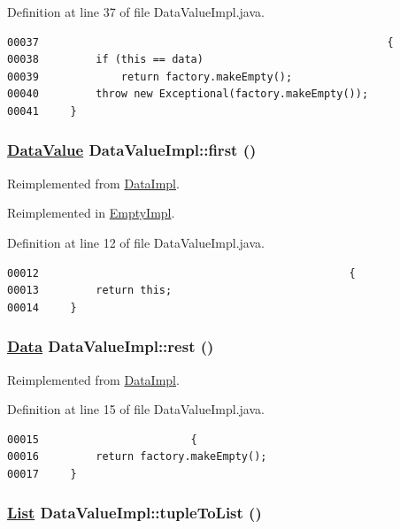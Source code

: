 Definition at line 37 of file Data\-Value\-Impl.java.\footnotesize\begin{verbatim}00037                                                       {
00038         if (this == data)
00039             return factory.makeEmpty();
00040         throw new Exceptional(factory.makeEmpty());
00041     }
\end{verbatim}\normalsize 
\hypertarget{classDataValueImpl_a0}{
\subsubsection[first]{\setlength{\rightskip}{0pt plus 5cm}\hyperlink{interfaceDataValue}{Data\-Value} Data\-Value\-Impl::first ()}}
\label{classDataValueImpl_a0}




Reimplemented from \hyperlink{classDataImpl_a2}{Data\-Impl}.

Reimplemented in \hyperlink{classEmptyImpl_a0}{Empty\-Impl}.

Definition at line 12 of file Data\-Value\-Impl.java.\footnotesize\begin{verbatim}00012                                                 {
00013         return this;
00014     }
\end{verbatim}\normalsize 
\hypertarget{classDataValueImpl_a1}{
\subsubsection[rest]{\setlength{\rightskip}{0pt plus 5cm}\hyperlink{interfaceData}{Data} Data\-Value\-Impl::rest ()}}
\label{classDataValueImpl_a1}




Reimplemented from \hyperlink{classDataImpl_a3}{Data\-Impl}.

Definition at line 15 of file Data\-Value\-Impl.java.\footnotesize\begin{verbatim}00015                        {
00016         return factory.makeEmpty();
00017     }
\end{verbatim}\normalsize 
\hypertarget{classDataValueImpl_a2}{
\subsubsection[tupleToList]{\setlength{\rightskip}{0pt plus 5cm}\hyperlink{interfaceList}{List} Data\-Value\-Impl::tuple\-To\-List ()}}
\label{classDataValueImpl_a2}





